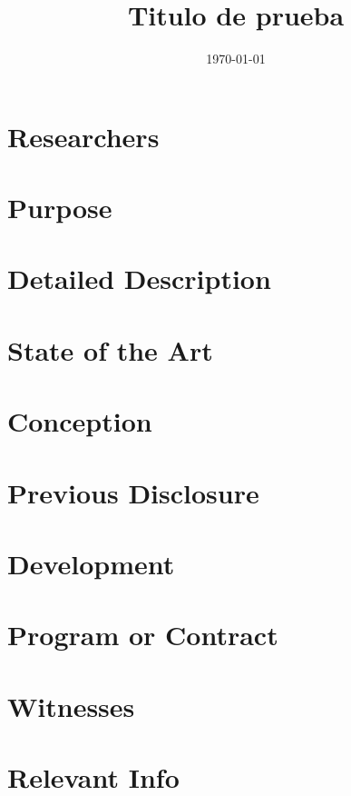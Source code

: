 \documentclass{article}
\title{
Titulo de prueba
}
\date{\today}
\begin{document}
\maketitle

\section*{Researchers}

\section*{Purpose}

\section*{Detailed Description}

\section*{State of the Art}

\section*{Conception}

\section*{Previous Disclosure}

\section*{Development}

\section*{Program or Contract}

\section*{Witnesses}

\section*{Relevant Info}
\end{document}
